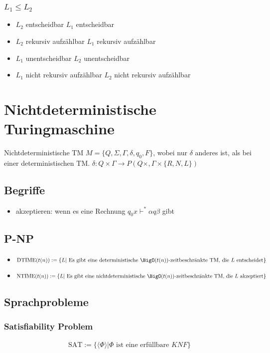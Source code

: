 \documentclass{article}
\begin{document}
\subsubsection{$L_1\leq L_2$}
\begin{itemize}
	\item $L_2$ entscheidbar \Rightarrow $L_1$ entscheidbar
	\item $L_2$ rekursiv aufzählbar \Rightarrow $L_1$ rekursiv aufzählbar
	\item $L_1$ unentscheidbar \Rightarrow $L_2$ unentscheidbar
	\item $L_1$ nicht rekursiv aufzählbar \Rightarrow $L_2$ nicht rekursiv aufzählbar
\end{itemize}
\section{Nichtdeterministische Turingmaschine}
Nichtdeterministische TM $M=\{Q, \Sigma, \Gamma, \delta, q_0, F\}$, wobei nur $\delta$ anderes ist, als bei einer deterministischen TM. $\delta: Q\times \Gamma \to P(Q\times, \Gamma \times \{R, N, L\})$
\subsection{Begriffe}
\begin{itemize}
	\item akzeptieren: wenn es eine Rechnung $q_0x\vdash^*\alpha q\beta$ gibt
\end{itemize}
\subsection{P-NP}
\begin{itemize}
	\item $\text{DTIME}(t(n)):=\{L|\text{ Es gibt eine deterministische }\BigO(t(n)) \text{-zeitbeschränkte TM, die } L \text{ entscheidet}\}$
	\item $\text{NTIME}(t(n)):=\{L|\text{ Es gibt eine nichtdeterministische }\BigO(t(n)) \text{-zeitbeschränkte TM, die } L \text{ akzeptiert}\}$
\end{itemize}
\subsection{Sprachprobleme}
\subsubsection{Satisfiability Problem}
\begin{align*}
	\text{SAT}:=\{\langle\Phi\rangle|\Phi\text{ ist eine erfüllbare }KNF\}
\end{align*}
\end{document}
